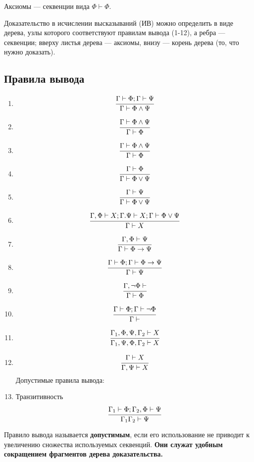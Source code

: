 \documentclass[oneside,final,14pt]{extreport}
\begin{document}
Аксиомы --- секвенции вида $\Phi \vdash \Phi$.

Доказательство в исчислении высказываний (ИВ) можно определить в виде дерева, узлы которого соответствуют правилам вывода (1-12), а ребра --- секвенции; вверху листья дерева --- аксиомы, внизу --- корень дерева (то, что нужно доказать).
\subsection*{Правила вывода}
\begin{enumerate}
	\item \[
	\cfrac{\Gamma \vdash \Phi; \Gamma \vdash \Psi}{\Gamma \vdash \Phi \wedge \Psi}
	\]
	\item \[
	\cfrac{\Gamma \vdash \Phi \wedge \Psi}{\Gamma \vdash \Phi}
	\]
	\item \[
	\cfrac{\Gamma \vdash \Phi \wedge \Psi}{\Gamma \vdash \Phi}
	\]
	\item \[
	\cfrac{\Gamma \vdash \Phi}{\Gamma \vdash \Phi \vee \Psi}	
	\]
	\item \[
	\cfrac{\Gamma \vdash \Psi}{\Gamma \vdash \Phi \vee \Psi}	
	\]
	\item \[
	\cfrac{\Gamma, \Phi \vdash X; \Gamma. \Psi \vdash X; \Gamma \vdash \Phi \vee \Psi}{\Gamma \vdash X}
	\]
	\item \[
	\cfrac{\Gamma, \Phi \vdash \Psi}{\Gamma \vdash \Phi \to \Psi}
	\]
	\item \[
	\cfrac{\Gamma \vdash \Phi; \Gamma \vdash \Phi \to \Psi}{\Gamma \vdash \Psi}
	\]
	\item \[
	\cfrac{\Gamma, \neg \Phi\vdash}{\Gamma \vdash \Phi}
	\]
	\item \[
	\cfrac{\Gamma \vdash \Phi; \Gamma \vdash \neg \Phi}{\Gamma \vdash}
	\]
	\item \[
	\cfrac{\Gamma_1, \Phi, \Psi, \Gamma_2 \vdash X}{\Gamma_1, \Psi, \Phi, \Gamma_2 \vdash X}
	\]
	\item \[
	\cfrac{\Gamma \vdash X}{\Gamma, \Psi \vdash X}
	\]
	Допустимые правила вывода:
	\item Транзитивность \[
	\cfrac{\Gamma_1 \vdash \Phi; \Gamma_2, \Phi \vdash \Psi}{\Gamma_1 \Gamma_2 \vdash \Psi}
	\]
\end{enumerate}

Правило вывода называется \textbf{допустимым}, если его использование не приводит к увеличению сножества используемых секвенций. \textbf{Они служат удобным сокращением фрагментов дерева доказательства.}
\end{document}
